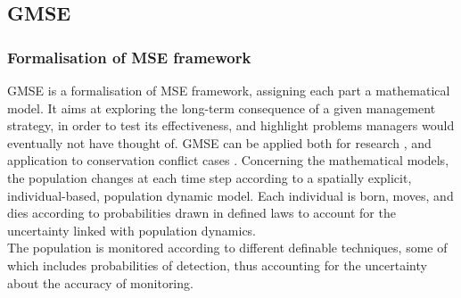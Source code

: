 \documentclass[12pt,a4paper]{article}
\begin{document}
\subsection{GMSE}%

\subsubsection{Formalisation of MSE framework}

GMSE is a formalisation of MSE framework, assigning each part a mathematical model. %
It aims at exploring the long-term consequence of a given management strategy, in order to test its effectiveness, and highlight problems managers would eventually not have thought of.
GMSE can be applied both for research \citep{cusack2018time}, and application to conservation conflict cases \citep{bainbridge2017goose}.
Concerning the mathematical models, the population changes at each time step according to a spatially explicit, individual-based, population dynamic model.
Each individual is born, moves, and dies according to probabilities drawn in defined laws to account for the uncertainty linked with population dynamics.\\
The population is monitored according to different definable techniques, some of which includes probabilities of detection, thus accounting for the uncertainty about the accuracy of monitoring.\\ %
\end{document}
